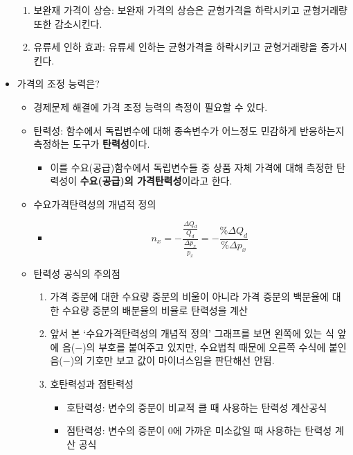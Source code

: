 \documentclass{report}
\begin{document}
\begin{itemize}
    \begin{enumerate}
        \item 보완재 가격이 상승: 보완재 가격의 상승은 균형가격을 하락시키고 균형거래량 또한 감소시킨다.
        \item 유류세 인하 효과: 유류세 인하는 균형가격을 하락시키고 균형거래량을 증가시킨다.
    \end{enumerate}
    \item 가격의 조정 능력은?
    \begin{itemize}
        \item 경제문제 해결에 가격 조정 능력의 측정이 필요할 수 있다.
        \item 탄력성: 함수에서 독립변수에 대해 종속변수가 어느정도 민감하게 반응하는지 측정하는 도구가 \textbf{탄력성}이다.
        \begin{itemize}
            \item 이를 수요(공급)함수에서 독립변수들 중 상품 자체 가격에 대해 측정한 탄력성이 \textbf{수요(공급)의 가격탄력성}이라고 한다.
        \end{itemize}
        \item 수요가격탄력성의 개념적 정의
        \begin{itemize}
            \item $$n_x = -\frac{\frac{\Delta Q_d}{Q_d}}{\frac{\Delta p_x}{p_x}} = -\frac{\%\Delta Q_d}{\%\Delta p_x}$$
        \end{itemize}
        \item 탄력성 공식의 주의점
        \begin{enumerate}
            \item 가격 증분에 대한 수요량 증분의 비울이 아니라 가격 증분의 백분율에 대한 수요량 증분의 배분율의 비율로 탄력성을 계산
            \item 앞서 본 `수요가격탄력성의 개념적 정의' 그래프를 보면 왼쪽에 있는 식 앞에 음($-$)의 부호를 붙여주고 있지만, 수요법칙 때문에 오른쪽 수식에 붙인 음($-$)의 기호만 보고 값이 마이너스임을 판단해선 안됨.
            \item 호탄력성과 점탄력성
            \begin{itemize}
                \item 호탄력성: 변수의 증분이 비교적 클 때 사용하는 탄력성 계산공식
                \item 점탄력성: 변수의 증분이 0에 가까운 미소값일 때 사용하는 탄력성 계산 공식
            \end{itemize}
        \end{enumerate}
    \end{itemize}
\end{itemize}
\end{document}
